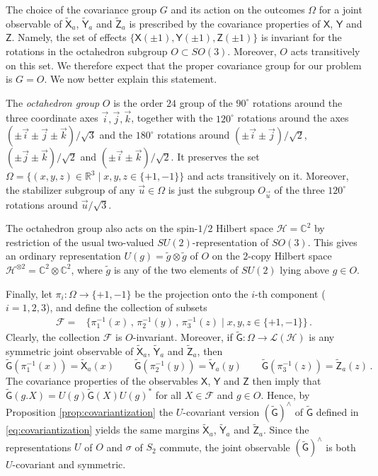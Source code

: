 \documentclass[12pt]{amsart}
\theoremstyle{definition}
\newcommand{\RR}{\mathbb R} %
\newcommand{\CC}{\mathbb C} %
\newcommand{\ff}{\mathcal{F}}
\newcommand{\hh}{\mathcal{H}} %
\newcommand{\lh}{\mathcal{L(H)}} %
\newcommand{\G}{\mathsf{G}}%
\newcommand{\X}{\mathsf{X}}%
\newcommand{\Y}{\mathsf{Y}}%
\newcommand{\Z}{\mathsf{Z}}%
\begin{document}
The choice of the covariance group $G$ and its action on the outcomes $\Omega$ for a joint observable of $\widetilde{\X}_a$, $\widetilde{\Y}_a$ and $\widetilde{\Z}_a$ is prescribed by the covariance properties of $\X$, $\Y$ and $\Z$. Namely, the set of effects $\{\X(\pm 1),\Y(\pm 1),\Z(\pm 1)\}$ is invariant for the rotations in the octahedron subgroup $O\subset SO(3)$. Moreover, $O$ acts transitively on this set. We therefore expect that the proper covariance group for our problem is $G=O$. We now better explain this statement.

The {\em octahedron group} $O$ is the order $24$ group of the $90^\circ$ rotations around the three coordinate axes $\vec{i},\vec{j},\vec{k}$, together with the $120^\circ$ rotations around the axes $(\pm\vec{i}\pm\vec{j}\pm\vec{k})/\sqrt{3}$ and the $180^\circ$ rotations around $(\pm\vec{i}\pm\vec{j})/\sqrt{2}$, $(\pm\vec{j}\pm\vec{k})/\sqrt{2}$ and $(\pm\vec{i}\pm\vec{k})/\sqrt{2}$. It preserves the set $\Omega = \{(x,y,z)\in\RR^3 \mid x,y,z\in\{+1,-1\}\}$ and acts transitively on it. Moreover, the stabilizer subgroup of any $\vec{u}\in\Omega$ is just the subgroup $O_{\vec{u}}$ of the three $120^\circ$ rotations around $\vec{u}/\sqrt{3}$.

The octahedron group also acts on the spin-$1/2$ Hilbert space $\hh=\CC^2$ by restriction of the usual two-valued $SU(2)$-representation of $SO(3)$. This gives an ordinary representation $U(g) = \tilde{g}\otimes\tilde{g}$ of $O$ on the $2$-copy Hilbert space $\hh^{\otimes 2} = \CC^2\otimes\CC^2$, where $\tilde{g}$ is any of the two elements of $SU(2)$ lying above $g\in O$.

Finally, let $\pi_i : \Omega\to\{+1,-1\}$ be the projection onto the $i$-th component ($i=1,2,3$), and define the collection of subsets
\begin{align*}
\ff = & \{\pi_1^{-1}(x) \,,\, \pi_2^{-1}(y) \,,\, \pi_3^{-1}(z) \mid x,y,z\in\{+1,-1\}\} \,.
\end{align*}
Clearly, the collection $\ff$ is $O$-invariant. Moreover, if $\widetilde{\G}:\Omega\to\lh$ is any symmetric joint observable of $\widetilde{\X}_a$, $\widetilde{\Y}_a$ and $\widetilde{\Z}_a$, then
$$
\widetilde{\G}(\pi_1^{-1}(x)) = \widetilde{\X}_a(x) \qquad \widetilde{\G}(\pi_2^{-1}(y)) = \widetilde{\Y}_a(y) \qquad \widetilde{\G}(\pi_3^{-1}(z)) = \widetilde{\Z}_a(z) \,.
$$
The covariance properties of the observables $\X$, $\Y$ and $\Z$ then imply that $\widetilde{\G}(g.X) = U(g)\widetilde{\G}(X)U(g)^*$ for all $X\in\ff$ and $g\in O$. Hence, by Proposition \ref{prop:covariantization} the $U$-covariant version $(\widetilde{\G})^\wedge$ of $\widetilde{\G}$ defined in \eqref{eq:covariantization} yields the same margins $\widetilde{\X}_a$, $\widetilde{\Y}_a$ and $\widetilde{\Z}_a$. Since the representations $U$ of $O$ and $\sigma$ of $S_2$ commute, the joint observable $(\widetilde{\G})^\wedge$ is both $U$-covariant and symmetric.
\end{document}
